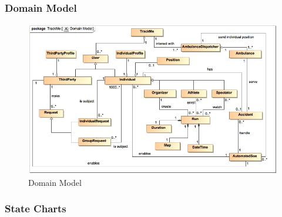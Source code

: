 \documentclass[a4paper]{article}
\begin{document}
    \subsubsection{Domain Model}
    \begin{figure}[!ht]
        \centering
        \includegraphics[width=\textwidth, keepaspectratio]{images/UML/DomainModel.jpg}
        \caption{Domain Model}
    \end{figure}
    
    \newpage

    \subsubsection{State Charts}
    
\end{document}
